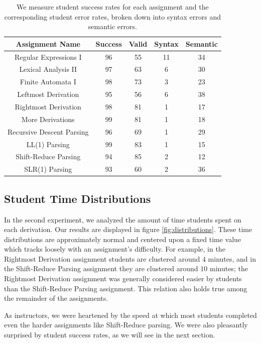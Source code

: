\documentclass{sigchi}
\newcommand\tabhead[1]{\small\textbf{#1}}
\begin{document}
\begin{table}[!h]
  \begin{tabular}{|c|c||c|c|c|}
    \hline
    \tabhead{Assignment Name} & \tabhead{Success} & \tabhead{Valid} & \tabhead{Syntax} & \tabhead{Semantic} \\
    \hline
    Regular Expressions I & 96 & 55 & 11 & 34 \\
    \hline
    Lexical Analysis II & 97 & 63 & 6 & 30 \\
    \hline
    Finite Automata I & 98 & 73 & 3 & 23 \\
    \hline
    Leftmost Derivation & 95 & 56 & 6 & 38 \\
    \hline
    Rightmost Derivation & 98 & 81  & 1 & 17 \\
    \hline
    More Derivations & 99 & 81 & 1 & 18 \\
    \hline
    Recursive Descent Parsing & 96 & 69 & 1 & 29 \\
    \hline
    LL(1) Parsing & 99 & 83 & 1 & 15 \\
    \hline
    Shift-Reduce Parsing & 94 & 85 & 2 & 12 \\
    \hline
    SLR(1) Parsing & 93 & 60 & 2 & 36 \\
    \hline
  \end{tabular}
  \caption{We measure student success rates for each assignment and the corresponding student error rates, broken down into syntax errors and semantic errors.}
  \label{tab:table1}
\end{table}

\subsection{Student Time Distributions}

In the second experiment, we analyzed the amount of time students spent on each derivation. Our results are displayed in figure \ref{fig:distributions}. These time distributions are approximately normal and centered upon a fixed time value which tracks loosely with an assignment's difficulty. For example, in the Rightmost Derivation assignment students are clustered around $4$ minutes, and in the Shift-Reduce Parsing assignment they are clustered around $10$ minutes; the Rightmost Derivation assignment was generally considered easier by students than the Shift-Reduce Parsing assignment. This relation also holds true among the remainder of the assignments.

As instructors, we were heartened by the speed at which most students completed even the harder assignments like Shift-Reduce parsing. We were also pleasantly surprised by student success rates, as we will see in the next section.
\end{document}
